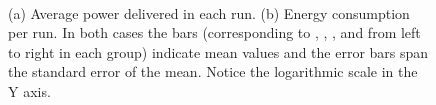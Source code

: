 \begin{figure}[!t]
~~
\caption{(a) Average power delivered in each run. (b) Energy consumption per run. In both cases the bars (corresponding to
  \raspberrynsp, \tabletnsp, \laptopnsp, \iMac and \blade from left to
  right in each group) indicate mean values and the error bars span
  the standard error of the mean. Notice the logarithmic scale in the
  Y axis.\label{fig:powerenergy}} 
\end{figure}


